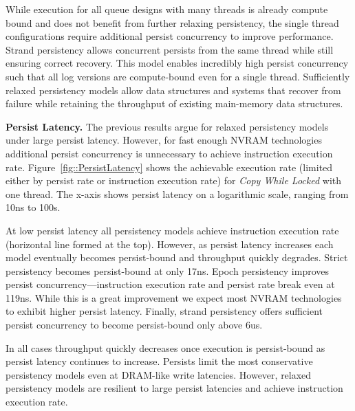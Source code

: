 While execution for all queue designs with many threads is already compute bound and does not benefit from further relaxing persistency, the single thread configurations require additional persist concurrency to improve performance.
Strand persistency allows concurrent persists from the same thread while still ensuring correct recovery.
This model enables incredibly high persist concurrency such that all log versions are compute-bound even for a single thread.
Sufficiently relaxed persistency models allow data structures and systems that recover from failure while retaining the throughput of existing main-memory data structures.

\textbf{Persist Latency.}
The previous results argue for relaxed persistency models under large persist latency.
However, for fast enough NVRAM technologies additional persist concurrency is unnecessary to achieve instruction execution rate.
Figure~\ref{fig::PersistLatency} shows the achievable execution rate (limited either by persist rate or instruction execution rate) for \emph{Copy While Locked} with one thread.
The x-axis shows persist latency on a logarithmic scale, ranging from 10ns to 100\textmu s.

%
 

At low persist latency all persistency models achieve instruction execution rate (horizontal line formed at the top).
However, as persist latency increases each model eventually becomes persist-bound and throughput quickly degrades.
Strict persistency becomes persist-bound at only 17ns.
Epoch persistency improves persist concurrency---instruction execution rate and persist rate break even at 119ns.
While this is a great improvement we expect most NVRAM technologies to exhibit higher persist latency.
Finally, strand persistency offers sufficient persist concurrency to become persist-bound only above 6us.

In all cases throughput quickly decreases once execution is persist-bound as persist latency continues to increase.
Persists limit the most conservative persistency models even at DRAM-like write latencies.
However, relaxed persistency models are resilient to large persist latencies and achieve instruction execution rate.

